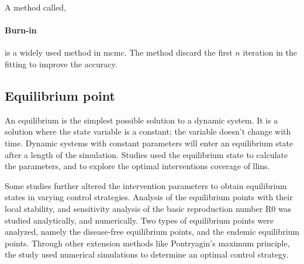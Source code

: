 \documentclass[a4paper, 12pt, twoside]{report}
\begin{document}
A method called,
\paragraph{Burn-in}%
\label{par:burn_in}
is a widely used method in \gls{mcmc}.
The method discard the first $n$ iteration in the fitting to improve the accuracy.

\subsection{Equilibrium point}%
\label{par:equilibrium_point}
An equilibrium is the simplest possible solution to a dynamic system.
It is a solution where the state variable is a constant; the variable doesn't change with time.
Dynamic systems with constant parameters will enter an equilibrium state after a length of the simulation.
Studies\cite{Handari2020, Nwankwo2019,NiazArifin2013,Heesterbeek2015a,Karl2016,Olaniyi2020,Stuckey2014,Tompkins2013,Tompkins2013,Mbogo2018,Winskill2019,Smith2019,Briet2013} used the equilibrium state to calculate the parameters, and to explore the optimal interventions coverage of \gls{llins}.

Some studies further altered the intervention parameters to obtain equilibrium states in varying control strategies.
Analysis of the equilibrium points with their local stability, and sensitivity analysis of the basic reproduction number \gls{R0} was studied analytically, and numerically.
Two types of equilibrium points were analyzed, namely the disease-free equilibrium points, and the endemic equilibrium points.
Through other extension methods like Pontryagin’s maximum principle, the study used numerical simulations to determine an optimal control strategy\cite{Tchoumi2020}.


\end{document}
